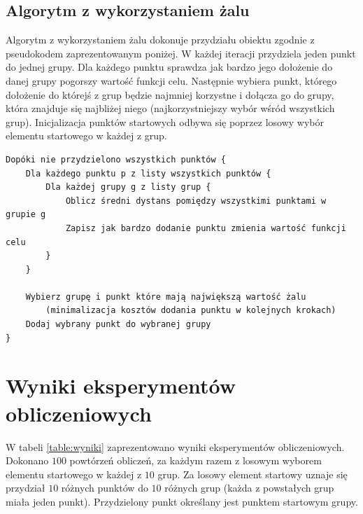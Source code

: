 \documentclass[main.tex]{subfiles}
\begin{document}
\subsection{Algorytm z wykorzystaniem żalu}
Algorytm z wykorzystaniem żalu dokonuje przydziału obiektu zgodnie z pseudokodem zaprezentowanym poniżej. W każdej iteracji przydziela jeden punkt do jednej grupy. Dla każdego punktu sprawdza jak bardzo jego dołożenie do danej grupy pogorszy wartość funkcji celu. Następnie wybiera punkt, którego dołożenie do którejś z grup będzie najmniej korzystne i dołącza go do grupy, która znajduje się najbliżej niego (najkorzystniejszy wybór wśród wszystkich grup). Inicjalizacja punktów startowych odbywa się poprzez losowy wybór elementu startowego w każdej z grup.

\begin{verbatim}
Dopóki nie przydzielono wszystkich punktów {
    Dla każdego punktu p z listy wszystkich punktów {
        Dla każdej grupy g z listy grup {
            Oblicz średni dystans pomiędzy wszystkimi punktami w grupie g
            Zapisz jak bardzo dodanie punktu zmienia wartość funkcji celu
        }
    }
    
    Wybierz grupę i punkt które mają największą wartość żalu
        (minimalizacja kosztów dodania punktu w kolejnych krokach)
    Dodaj wybrany punkt do wybranej grupy
}
\end{verbatim}

\section{Wyniki eksperymentów obliczeniowych}
\label{section:wyniki}
W tabeli \ref{table:wyniki} zaprezentowano wyniki eksperymentów obliczeniowych. Dokonano $100$ powtórzeń obliczeń, za każdym razem z losowym wyborem elementu startowego w każdej z $10$ grup. Za losowy element startowy uznaje się przydział $10$ różnych punktów do $10$ różnych grup (każda z powstałych grup miała jeden punkt). Przydzielony punkt określany jest punktem startowym grupy.
\end{document}
